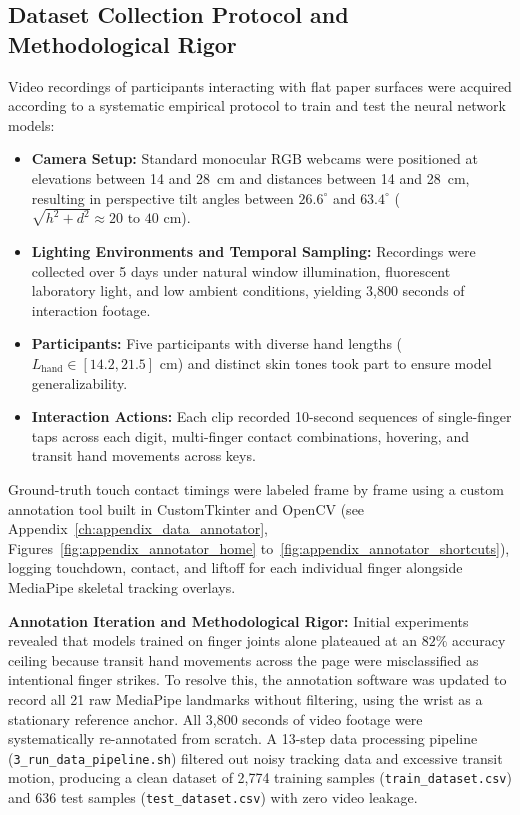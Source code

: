 \subsection{Dataset Collection Protocol and Methodological Rigor}
\label{subsec:meth_dataset_capture}
Video recordings of participants interacting with flat paper surfaces were acquired according to a systematic empirical protocol to train and test the neural network models:
\begin{itemize}
    \item \textbf{Camera Setup:} Standard monocular RGB webcams were positioned at elevations between 14 and 28~cm and distances between 14 and 28~cm, resulting in perspective tilt angles between $26.6^\circ$ and $63.4^\circ$ ($\sqrt{h^2+d^2} \approx 20\text{ to }40\text{ cm}$).
    \item \textbf{Lighting Environments and Temporal Sampling:} Recordings were collected over 5 days under natural window illumination, fluorescent laboratory light, and low ambient conditions, yielding 3,800 seconds of interaction footage.
    \item \textbf{Participants:} Five participants with diverse hand lengths ($L_{\text{hand}} \in [14.2, 21.5]\text{ cm}$) and distinct skin tones took part to ensure model generalizability.
    \item \textbf{Interaction Actions:} Each clip recorded 10-second sequences of single-finger taps across each digit, multi-finger contact combinations, hovering, and transit hand movements across keys.
\end{itemize}

Ground-truth touch contact timings were labeled frame by frame using a custom annotation tool built in CustomTkinter and OpenCV (see Appendix~\ref{ch:appendix_data_annotator}, Figures~\ref{fig:appendix_annotator_home} to~\ref{fig:appendix_annotator_shortcuts}), logging touchdown, contact, and liftoff for each individual finger alongside MediaPipe skeletal tracking overlays.

\textbf{Annotation Iteration and Methodological Rigor:} Initial experiments revealed that models trained on finger joints alone plateaued at an $82\%$ accuracy ceiling because transit hand movements across the page were misclassified as intentional finger strikes. To resolve this, the annotation software was updated to record all 21 raw MediaPipe landmarks without filtering, using the wrist as a stationary reference anchor. All 3,800 seconds of video footage were systematically re-annotated from scratch. A 13-step data processing pipeline (\texttt{3\_run\_data\_pipeline.sh}) filtered out noisy tracking data and excessive transit motion, producing a clean dataset of 2,774 training samples (\texttt{train\_dataset.csv}) and 636 test samples (\texttt{test\_dataset.csv}) with zero video leakage.

